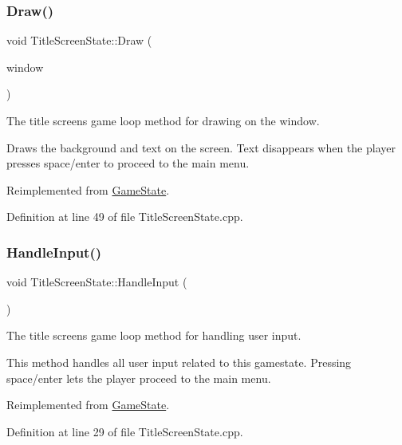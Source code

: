 \subsubsection{\texorpdfstring{Draw()}{Draw()}}
{\footnotesize\ttfamily void Title\+Screen\+State\+::\+Draw (\begin{DoxyParamCaption}\item[{sf\+::\+Render\+Window \&}]{window }\end{DoxyParamCaption})\hspace{0.3cm}{\ttfamily [virtual]}}



The title screen\textquotesingle{}s game loop method for drawing on the window. 

Draws the background and text on the screen. Text disappears when the player presses space/enter to proceed to the main menu. 

Reimplemented from \hyperlink{class_game_state_a8741c5c696c6c366beb4b845c08c3cf8}{Game\+State}.



Definition at line 49 of file Title\+Screen\+State.\+cpp.

\mbox{\label{class_title_screen_state_a1bad900daba7f6481632a58212f39af0}} 
\subsubsection{\texorpdfstring{Handle\+Input()}{HandleInput()}}
{\footnotesize\ttfamily void Title\+Screen\+State\+::\+Handle\+Input (\begin{DoxyParamCaption}{ }\end{DoxyParamCaption})\hspace{0.3cm}{\ttfamily [virtual]}}



The title screen\textquotesingle{}s game loop method for handling user input. 

This method handles all user input related to this gamestate. Pressing space/enter lets the player proceed to the main menu. 

Reimplemented from \hyperlink{class_game_state_a8bce2828cee99ae7c07322804531fd01}{Game\+State}.



Definition at line 29 of file Title\+Screen\+State.\+cpp.

